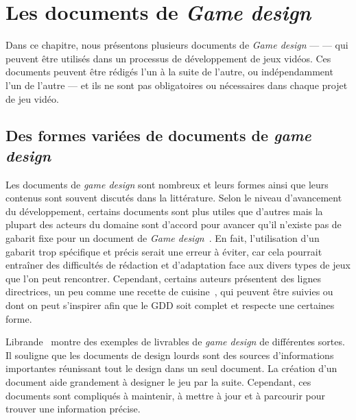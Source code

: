 \chapter{Les documents de \emph{Game design}}

\label{chap.design_doc}

Dans ce chapitre, nous pr\'esentons plusieurs documents de \emph{Game design} ---  --- qui peuvent être utilisés dans un processus de développement de jeux vidéos.
Ces documents peuvent être rédigés l'un à la suite de l'autre, ou indépendamment l'un de l'autre --- et ils ne sont pas obligatoires ou nécessaires dans chaque projet de jeu vidéo.






\section{Des formes variées de documents de \emph{game design}}

Les documents de \emph{game design} sont nombreux et leurs formes ainsi que leurs contenus sont souvent discut\'es dans la littérature.
Selon le niveau d'avancement du développement, certains documents sont plus utiles que d'autres mais la plupart des acteurs du domaine sont d'accord pour avancer qu'il n'existe pas de gabarit fixe pour un document de \emph{Game design}~\cite{GD_theory_rouse}.
En fait, l'utilisation d'un gabarit trop sp\'ecifique et précis serait une erreur à \'eviter, car cela pourrait entraîner des difficultés de rédaction et d'adaptation face aux divers types de jeux que l'on peut rencontrer.
Cependant, certains auteurs présentent des lignes directrices, un peu comme une recette de cuisine~\cite{LevelUpRogers2014}, qui peuvent être suivies ou dont on peut s'inspirer afin que le GDD soit complet et respecte une certaines forme. 

Librande~\cite{onepage_librande} montre des exemples de livrables de \emph{game design} de différentes sortes.
Il souligne que les documents de design lourds sont des sources d'informations importantes réunissant tout le design dans un seul document. La création d'un document aide grandement à designer le jeu par la suite.
Cependant, ces documents sont compliqués à maintenir, \`a mettre à jour et à parcourir pour trouver une information précise.


